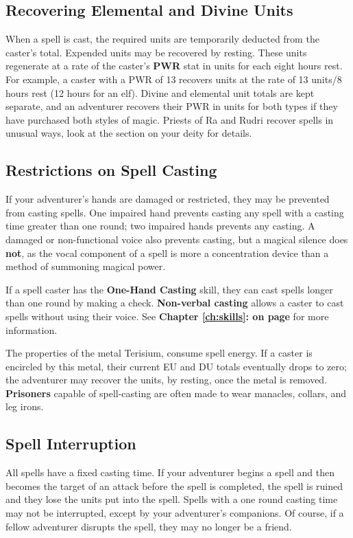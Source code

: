 \begin{multicols*}{2}
\subsection{Recovering Elemental and Divine Units}
When a spell is cast, the required units are temporarily deducted from the caster’s total. Expended units may be recovered by resting. These units regenerate at a rate
of the caster’s \textbf{PWR} stat in units for each eight hours rest. For example, a caster with a PWR of 13 recovers units at the rate of 13 units/8 hours rest (12 hours for an elf). Divine and elemental unit totals are kept separate, and an adventurer recovers their PWR in units for both types if they have purchased both styles of magic. Priests of Ra and Rudri recover spells in unusual ways, look at the section on your deity for details.
\subsection{Restrictions on Spell Casting}
If your adventurer's hands are damaged or restricted, they may be prevented from casting spells. One impaired hand prevents casting any spell with a casting time greater than one round; two impaired hands prevents any casting. A damaged or non-functional voice also prevents casting, but a magical silence does \textbf{not}, as the vocal component of a spell is more a concentration device than a method of summoning magical power. 

If a spell caster has the \textbf{One-Hand Casting} skill, they can cast spells longer than one round by making a check. \textbf{Non-verbal casting} allows a caster to cast spells without using their voice. See \textbf{Chapter \ref{ch:skills}:  on page \pageref{ch:skills}} for more information.

The properties of the metal Terisium, consume spell energy. If a caster is encircled by this metal, their current EU and DU totals eventually drops to zero; the adventurer may recover the units, by resting, once the metal is removed. 
\textbf{Prisoners} capable of spell-casting are often made to wear manacles, collars, and leg irons.
\subsection{Spell Interruption}
All spells have a fixed casting time. If your adventurer begins a spell and then becomes the target of an attack before the spell is completed, the spell is ruined and they lose the units put into the spell. Spells with a one round casting time may not be interrupted, except by your adventurer’s companions. Of course, if a fellow adventurer disrupts the spell, they may no longer be a friend.

\end{multicols*}
